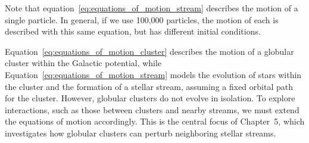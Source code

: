         Note that equation~\ref{eq:equations_of_motion_stream} describes the motion of a single particle. In general, if we use 100,000 particles, the motion of each is described with this same equation, but has different initial conditions. 
        
        Equation~\ref{eq:equations_of_motion_cluster} describes the motion of a globular cluster within the Galactic potential, while Equation~\ref{eq:equations_of_motion_stream} models the evolution of stars within the cluster and the formation of a stellar stream, assuming a fixed orbital path for the cluster. However, globular clusters do not evolve in isolation. To explore interactions, such as those between clusters and nearby streams, we must extend the equations of motion accordingly. This is the central focus of Chapter~5, which investigates how globular clusters can perturb neighboring stellar streams.

